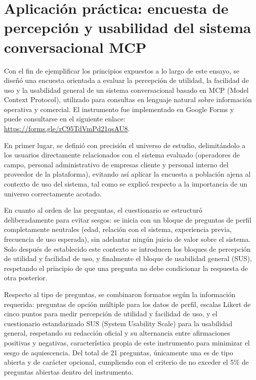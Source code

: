 \documentclass[12pt, letterpaper]{article}
\begin{document}
\section{Aplicación práctica: encuesta de percepción y usabilidad del sistema conversacional MCP}

Con el fin de ejemplificar los principios expuestos a lo largo de este ensayo, se diseñó una encuesta orientada a evaluar la percepción de utilidad, la facilidad de uso y la usabilidad general de un sistema conversacional basado en MCP (Model Context Protocol), utilizado para consultas en lenguaje natural sobre información operativa y comercial. El instrumento fue implementado en Google Forms y puede consultarse en el siguiente enlace: \url{https://forms.gle/rC95TdVmPd21qsAU8}.

En primer lugar, se definió con precisión el universo de estudio, delimitándolo a los usuarios directamente relacionados con el sistema evaluado (operadores de campo, personal administrativo de empresas cliente y personal interno del proveedor de la plataforma), evitando así aplicar la encuesta a población ajena al contexto de uso del sistema, tal como se explicó respecto a la importancia de un universo correctamente acotado.


En cuanto al orden de las preguntas, el cuestionario se estructuró deliberadamente para evitar sesgos: se inicia con un bloque de preguntas de perfil completamente neutrales (edad, relación con el sistema, experiencia previa, frecuencia de uso esperada), sin adelantar ningún juicio de valor sobre el sistema. Solo después de establecido este contexto se introducen los bloques de percepción de utilidad y facilidad de uso, y finalmente el bloque de usabilidad general (SUS), respetando el principio de que una pregunta no debe condicionar la respuesta de otra posterior.

Respecto al tipo de preguntas, se combinaron formatos según la información requerida: preguntas de opción múltiple para los datos de perfil, escalas Likert de cinco puntos para medir percepción de utilidad y facilidad de uso, y el cuestionario estandarizado SUS (System Usability Scale) para la usabilidad general, respetando su redacción oficial y su alternancia entre afirmaciones positivas y negativas, característica propia de este instrumento para minimizar el sesgo de aquiescencia. Del total de 21 preguntas, únicamente una es de tipo abierta y de carácter opcional, cumpliendo con el criterio de no exceder el 5\% de preguntas abiertas dentro del instrumento.
\end{document}
